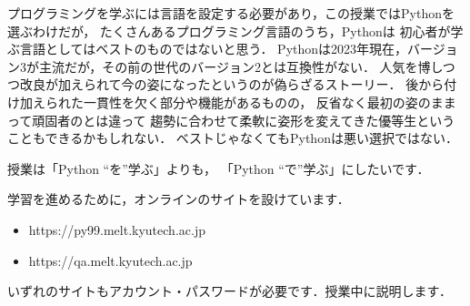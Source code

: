
プログラミングを学ぶには言語を設定する必要があり，この授業ではPythonを選ぶわけだが，
たくさんあるプログラミング言語のうち，Pythonは
初心者が学ぶ言語としてはベストのものではないと思う．
Pythonは2023年現在，バージョン3が主流だが，その前の世代のバージョン2とは互換性がない．
人気を博しつつ改良が加えられて今の姿になったというのが偽らざるストーリー．
後から付け加えられた一貫性を欠く部分や機能があるものの，
反省なく最初の姿のままって頑固者のとは違って
趨勢に合わせて柔軟に姿形を変えてきた優等生ということもできるかもしれない．
ベストじゃなくてもPythonは悪い選択ではない．

授業は「Python ``を''学ぶ」よりも，
「Python ``で''学ぶ」にしたいです．


学習を進めるために，オンラインのサイトを設けています．

\begin{itemize}
\item https://py99.melt.kyutech.ac.jp
\item https://qa.melt.kyutech.ac.jp
\end{itemize}

いずれのサイトもアカウント・パスワードが必要です．授業中に説明します．
